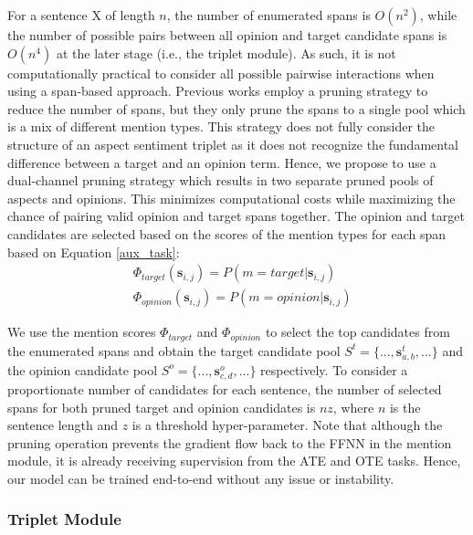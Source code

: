 \documentclass[11pt,a4paper]{article}
\begin{document}
For a sentence X of length $n$, the number of enumerated spans is $O(n^2)$,
while the number of possible pairs between all opinion and target candidate spans is $O(n^4)$ at the later stage (i.e., the triplet module).
As such, it is not computationally practical to consider all possible pairwise interactions when using a span-based approach.
Previous works \cite{luan-etal-2019-general, Wadden2019EntityRA} employ a pruning strategy to reduce the number of spans, but they only prune the spans to a single pool which is a mix of different mention types. 
This strategy does not fully consider the structure of an aspect sentiment triplet as it does not recognize the fundamental difference between a target and an opinion term.
Hence, we propose to use a dual-channel pruning strategy which results in two separate pruned pools of aspects and opinions. This minimizes computational costs while maximizing the chance of pairing valid opinion and target spans together.
The opinion and target candidates are selected based on the scores of the mention types for each span based on Equation \ref{aux_task}: 
\begin{equation}
\begin{split}
&\Phi_{target}(\mathbf{s}_{i,j}) = P(m=target|\mathbf{s}_{i, j}) \\
&\Phi_{opinion}(\mathbf{s}_{i,j}) = P(m=opinion|\mathbf{s}_{i, j})
\end{split}
\end{equation} 



We use the mention scores $\Phi_{target}$ and $\Phi_{opinion}$ 
to select the top candidates from the enumerated spans 
and obtain the target candidate pool $S^t=\{ ...,  \mathbf{s}^t_{a,b}, ... \}$
and the opinion candidate pool  $S^o=\{ ...,  \mathbf{s}^o_{c,d}, ... \}$ respectively.
To consider a proportionate number of candidates for each sentence,
the number of selected spans for both pruned target and opinion candidates is $nz$, where $n$ is the sentence length and $z$ is a threshold hyper-parameter.
Note that although the pruning operation 
prevents the gradient flow back to the FFNN in the mention module,
it is already receiving supervision from the ATE and OTE tasks.
Hence, our model can be trained end-to-end without any issue or instability.





\subsubsection{Triplet Module}
\label{triplet_module}
\end{document}
